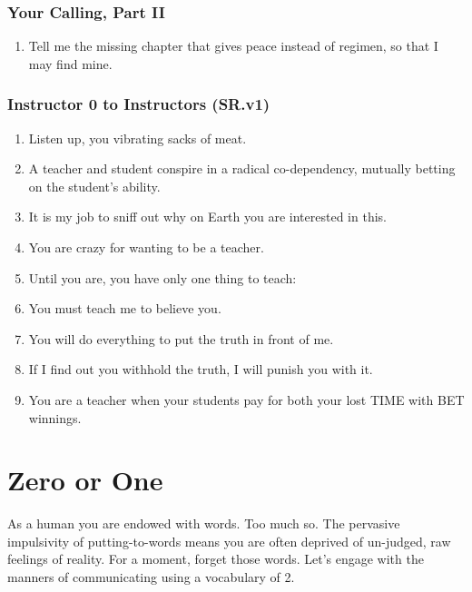 \documentclass[
]{book}
\providecommand{\tightlist}{%
  \setlength{\itemsep}{0pt}\setlength{\parskip}{0pt}}
\begin{document}
\hypertarget{your-calling-part-ii}{%
\subsection{Your Calling, Part II}\label{your-calling-part-ii}}

\begin{enumerate}
\def\labelenumi{\arabic{enumi}.}
\setcounter{enumi}{3}
\tightlist
\item
  Tell me the missing chapter
  that gives peace instead of regimen,
  so that I may find mine.
\end{enumerate}

\hypertarget{instructor-0-to-instructors-sr.v1}{%
\subsection{Instructor 0 to Instructors (SR.v1)}\label{instructor-0-to-instructors-sr.v1}}

\begin{enumerate}
\def\labelenumi{\arabic{enumi}.}
\setcounter{enumi}{4}
\tightlist
\item
  Listen up, you vibrating sacks of meat.
\item
  A teacher and student conspire in a radical co-dependency, mutually betting on
  the student's ability.
\item
  It is my job to sniff out why on Earth you are interested in this.
\item
  You are crazy for wanting to be a teacher.
\item
  Until you are, you have only one thing to teach:
\item
  You must teach me to believe you.
\item
  You will do everything to put the truth in front of me.
\item
  If I find out you withhold the truth, I will punish you with it.
\item
  You are a teacher when your students pay for both your lost TIME with BET winnings.
\end{enumerate}

\hypertarget{appendix-lessons}{%
\appendix}


\hypertarget{zero-or-one}{%
\chapter{Zero or One}\label{zero-or-one}}

As a human you are endowed with words.
Too much so. The pervasive impulsivity of putting-to-words means you are often deprived
of un-judged, raw feelings of reality.
For a moment, forget those words.
Let's engage with the manners of communicating
using a vocabulary of 2.
\end{document}
